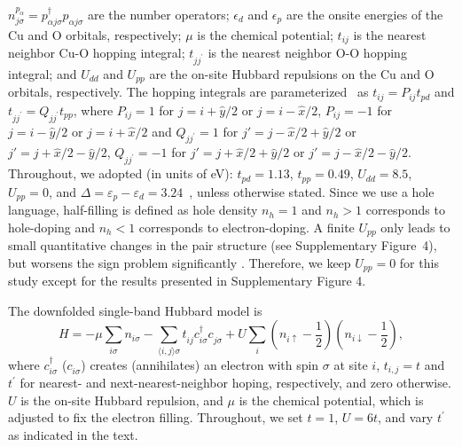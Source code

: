 \documentclass[11pt,superscriptaddress,floatfix,notitlepage]{revtex4-1}
\begin{document}
$n^{p_\alpha}_{j\sigma}=p^\dagger_{\alpha j\sigma}p^{\phantom\dagger}_{\alpha j\sigma}$ are the number operators; $\epsilon_d$ and $\epsilon_p$ are the onsite energies of the Cu and O orbitals, respectively; $\mu$ is the chemical potential; $t_{ij}$ is the nearest neighbor Cu-O hopping integral; $t_{jj^\prime}$ is the nearest neighbor O-O hopping integral; and $U_{dd}$ and $U_{pp}$ are the on-site Hubbard repulsions on the Cu and O orbitals, respectively. The hopping integrals are parameterized~\cite{Kung} as $t_{ij} = P_{ij}t_{pd}$ and $t_{jj^\prime} =  Q_{jj^\prime} t_{pp}$, where $P_{ij}=1$ for $j=i+\hat{y}/2$ or $j=i-\hat{x}/2$, $P_{ij}=-1$ for $j=i-\hat{y}/2$ or $j=i+\hat{x}/2$  and $Q_{jj^\prime}=1$ for $j'=j-\hat{x}/2+\hat{y}/2$ or $j'=j+\hat{x}/2-\hat{y}/2$, $Q_{jj^\prime}=-1$ for $j'=j+\hat{x}/2+\hat{y}/2$ or $j'=j-\hat{x}/2-\hat{y}/2$. Throughout, we adopted (in units of eV): $t_{pd} = 1.13$, $t_{pp} = 0.49$, $U_{dd} = 8.5$, $U_{pp} = 0$, and $\Delta = \varepsilon_p -\varepsilon_d = 3.24$~\cite{Kung,Czyzyk,Johnston,Ohta}, unless otherwise stated. Since we use a hole language, half-filling is defined as hole density $n_h=1$ and $n_h>1$ corresponds to hole-doping and $n_h<1$ corresponds to electron-doping. A finite $U_{pp}$ only leads to small quantitative changes in the pair structure (see Supplementary Figure~4), but worsens the sign problem significantly \cite{Kung}. Therefore, we keep $U_{pp}=0$ for this study except for the results presented in Supplementary Figure 4.

The downfolded single-band Hubbard model is 
\begin{equation}\label{singleband}
    H = -\mu\sum_{i \sigma} n_{i  \sigma} - \sum_{\langle  i,j\rangle \sigma} 
    t^{\phantom\dagger}_{ij}c^\dagger_{i \sigma}c^{\phantom\dagger}_{j \sigma} + 
    U \sum_{i}\left(n_{i \uparrow}-\frac{1}{2}\right)\left(n_{i \downarrow}-\frac{1}{2}\right),
\end{equation}
where $c^\dagger_{i \sigma}$ ($c^{\phantom\dagger}_{i \sigma}$) creates (annihilates) an electron with spin $\sigma$ at site $i$, $t_{i,j} = t$ and $t^\prime$ for nearest- and next-nearest-neighbor hoping, respectively, and zero otherwise. $U$ is the on-site Hubbard repulsion, and  $\mu$ is the chemical potential, which is adjusted to fix the electron filling. Throughout, we set $t = 1$, $U = 6t$, and vary $t^\prime$ as indicated in the text. 
\newline
\end{document}
